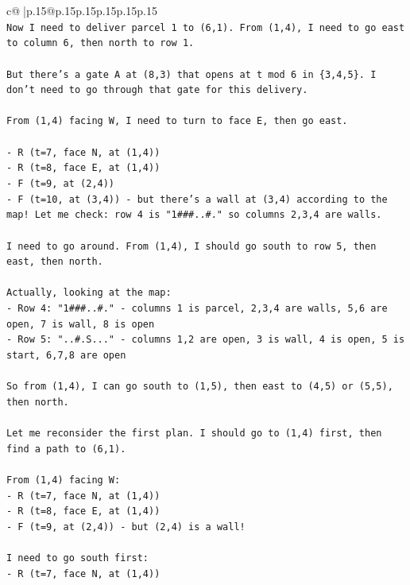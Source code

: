 \documentclass{article}
\begin{document}
{\begin{supertabular}{c@{$\;$}|p{.15\linewidth}@{}p{.15\linewidth}p{.15\linewidth}p{.15\linewidth}p{.15\linewidth}p{.15\linewidth}}
{{{\\ 
\texttt{Now I need to deliver parcel 1 to (6,1). From (1,4), I need to go east to column 6, then north to row 1.} \\
\\ 
\texttt{But there's a gate A at (8,3) that opens at t mod 6 in \{3,4,5\}. I don't need to go through that gate for this delivery.} \\
\\ 
\texttt{From (1,4) facing W, I need to turn to face E, then go east.} \\
\\ 
\texttt{{-} R (t=7, face N, at (1,4))} \\
\texttt{{-} R (t=8, face E, at (1,4))} \\
\texttt{{-} F (t=9, at (2,4))} \\
\texttt{{-} F (t=10, at (3,4)) {-} but there's a wall at (3,4) according to the map! Let me check: row 4 is "1\#\#\#..\#." so columns 2,3,4 are walls.} \\
\\ 
\texttt{I need to go around. From (1,4), I should go south to row 5, then east, then north.} \\
\\ 
\texttt{Actually, looking at the map:} \\
\texttt{{-} Row 4: "1\#\#\#..\#." {-} columns 1 is parcel, 2,3,4 are walls, 5,6 are open, 7 is wall, 8 is open} \\
\texttt{{-} Row 5: "..\#.S..." {-} columns 1,2 are open, 3 is wall, 4 is open, 5 is start, 6,7,8 are open} \\
\\ 
\texttt{So from (1,4), I can go south to (1,5), then east to (4,5) or (5,5), then north.} \\
\\ 
\texttt{Let me reconsider the first plan. I should go to (1,4) first, then find a path to (6,1).} \\
\\ 
\texttt{From (1,4) facing W:} \\
\texttt{{-} R (t=7, face N, at (1,4))} \\
\texttt{{-} R (t=8, face E, at (1,4))} \\
\texttt{{-} F (t=9, at (2,4)) {-} but (2,4) is a wall!} \\
\\ 
\texttt{I need to go south first:} \\
\texttt{{-} R (t=7, face N, at (1,4))} \\
}}}
\end{supertabular}}
\end{document}
